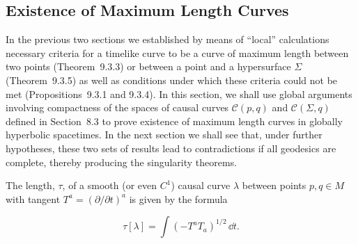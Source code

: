 
\subsection{Existence of Maximum Length Curves}\label{sec:9.4}

\setcounter{theorem}{0}

In the previous two sections we established by means of ``local'' calculations
necessary criteria for a timelike curve to be a curve of maximum length between two
points (Theorem~9.3.3) or between a point and a hypersurface \(\Sigma\)
(Theorem~9.3.5) as well as conditions under which these criteria could not be met
(Propositions~9.3.1 and 9.3.4). In this section, we shall use global arguments
involving compactness of the spaces of causal curves \(\mathcal C(p,q)\) and
\(\mathcal C(\Sigma,q)\) defined in Section~8.3 to prove existence of maximum length
curves in globally hyperbolic spacetimes. In the next section we shall see that,
under further hypotheses, these two sets of results lead to contradictions if all
geodesics are complete, thereby producing the singularity theorems.

The length, \(\tau\), of a smooth (or even \(C^1\)) causal curve \(\lambda\) between
points \(p,q\in M\) with tangent \(T^a=(\partial/\partial t)^a\) is given by the formula

\begin{equation}
  \tau[\lambda]=\int(-T^aT_a)^{1/2}\,\dd t .
  \tag{9.4.1}\label{eq:9.4.1}
\end{equation}

